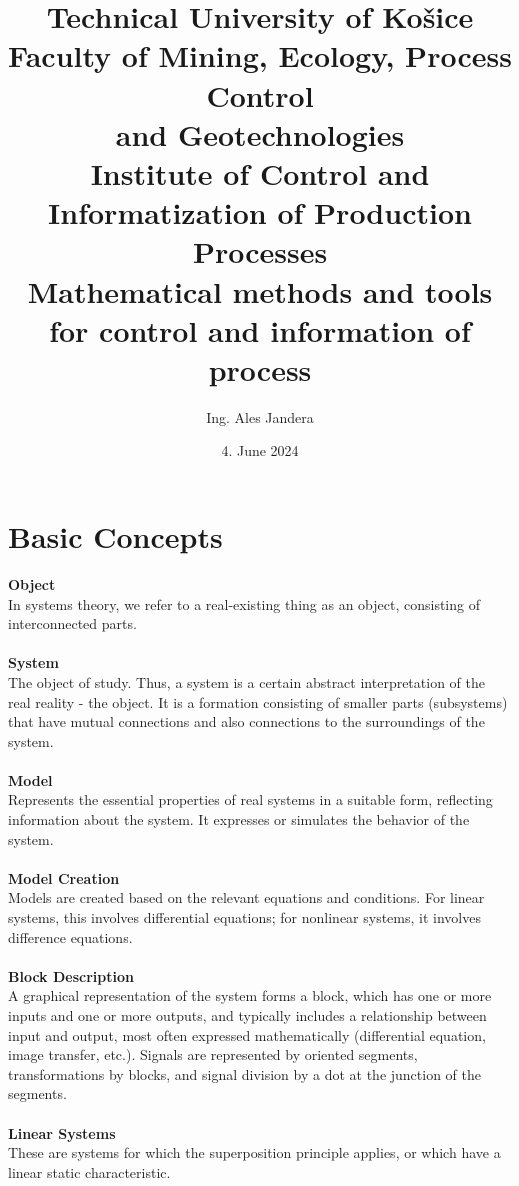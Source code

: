 \documentclass[12pt]{article}
\title{
{\textbf{Technical University of Košice}}\\
\vspace{12pt}
{\large \textbf{Faculty of Mining, Ecology, Process Control\\ and Geotechnologies}}\\
\vspace{12pt}
{\large Institute of Control and Informatization of Production Processes}\\
\vspace{64pt}
{\textbf{Mathematical methods and tools for control and information of process}}\\
}
\author{Ing. Ales Jandera}
\date{4. June 2024}
\begin{document}
\maketitle

\newpage

\tableofcontents

\newpage

\section{Basic Concepts}

\textbf{Object}\\
In systems theory, we refer to a real-existing thing as an object, consisting of
interconnected parts.\\
\\
\textbf{System}\\
The object of study. Thus, a system is a certain abstract interpretation of the real
reality - the object. It is a formation consisting of smaller parts (subsystems) that
have mutual connections and also connections to the surroundings of the system.\\
\\
\textbf{Model}\\
Represents the essential properties of real systems in a suitable form, reflecting
information about the system. It expresses or simulates the behavior of the system.\\
\\
\textbf{Model Creation}\\
Models are created based on the relevant equations and conditions. For linear systems,
this involves differential equations; for nonlinear systems, it involves difference
equations.\\
\\
\textbf{Block Description}\\
A graphical representation of the system forms a block, which has one or more inputs
and one or more outputs, and typically includes a relationship between input and output,
most often expressed mathematically (differential equation, image transfer, etc.).
Signals are represented by oriented segments, transformations by blocks, and signal
division by a dot at the junction of the segments.\\
\\
\textbf{Linear Systems}\\
These are systems for which the superposition principle applies, or which have a
linear static characteristic.\\
\end{document}
